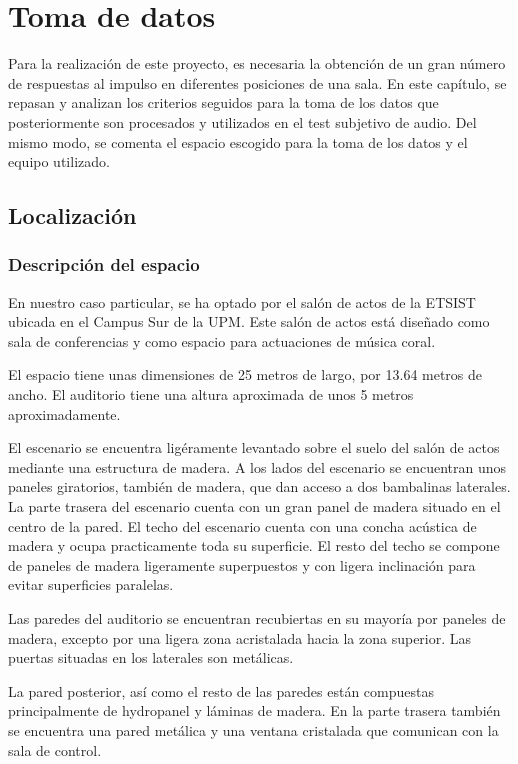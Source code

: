 \documentclass[11pt,a4paper,twoside]{book}
\author{Víctor de Tejada Molera}
\begin{document}
\chapter{Toma de datos}
	Para la realización de este proyecto, es necesaria la obtención de un gran número de respuestas al impulso en diferentes posiciones de una sala. En este capítulo, se repasan y analizan los criterios seguidos para la toma de los datos que posteriormente son procesados y utilizados en el test subjetivo de audio. Del mismo modo, se comenta el espacio escogido para la toma de los datos y el equipo utilizado.

	\section{Localización}

		\subsection{Descripción del espacio}

 			En nuestro caso particular, se ha optado por el salón de actos de la ETSIST ubicada en el Campus Sur de la UPM. Este salón de actos está diseñado como sala de conferencias y como espacio para actuaciones de música coral. 
 
 			El espacio tiene unas dimensiones de 25 metros de largo, por 13.64 metros de ancho. El auditorio tiene una altura aproximada de unos 5 metros aproximadamente.
 
 			El escenario se encuentra ligéramente levantado sobre el suelo del salón de actos mediante una estructura de madera. A los lados del escenario se encuentran unos paneles giratorios, también de madera, que dan acceso a dos bambalinas laterales. La parte trasera del escenario cuenta con un gran panel de madera situado en el centro de la pared. El techo del escenario cuenta con una concha acústica de madera y ocupa practicamente toda su superficie. El resto del techo se compone de paneles de madera ligeramente superpuestos y con ligera inclinación para evitar superficies paralelas.
 
 			Las paredes del auditorio se encuentran recubiertas en su mayoría por paneles de madera, excepto por una ligera zona acristalada hacia la zona superior. Las puertas situadas en los laterales son metálicas. 
 
 			La pared posterior, así como el resto de las paredes están compuestas principalmente de hydropanel y láminas de madera. En la parte trasera también se encuentra una pared metálica y una ventana cristalada que comunican con la sala de control.
 
\end{document}
